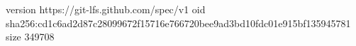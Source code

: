 version https://git-lfs.github.com/spec/v1
oid sha256:cd1c6ad2d87c28099672f15716e766720bee9ad3bd10fdc01e915bf135945781
size 349708
